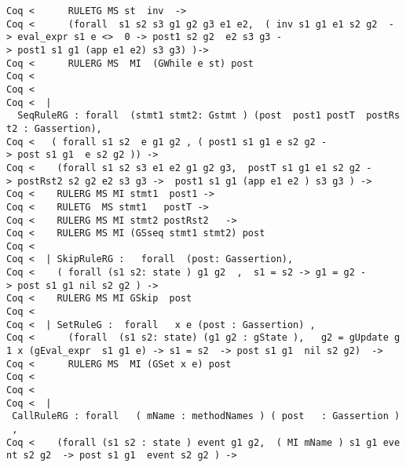 \documentclass{article}
\begin{document}
{\begin{flushleft}
\texttt{Coq~{<}~~~~~~RULETG~MS~st~~inv~~-{>}}\\
\texttt{Coq~{<}~~~~~~(forall~~s1~s2~s3~g1~g2~g3~e1~e2,~~(~inv~s1~g1~e1~s2~g2~~-{>}~eval\_expr~s1~e~{<}{>}~~0~-{>}~post1~s2~g2~~e2~s3~g3~-{>}~post1~s1~g1~(app~e1~e2)~s3~g3)~)-{>}}\\
\texttt{Coq~{<}~~~~~~RULERG~MS~~MI~~(GWhile~e~st)~post~~}\\
\texttt{Coq~{<}~}\\
\texttt{Coq~{<}~}\\
\texttt{Coq~{<}~~|~~SeqRuleRG~:~forall~~(stmt1~stmt2:~Gstmt~)~(post~~post1~postT~~postRst2~:~Gassertion),~}\\
\texttt{Coq~{<}~~~(~forall~s1~s2~~e~g1~g2~,~(~post1~s1~g1~e~s2~g2~-{>}~post~s1~g1~~e~s2~g2~))~-{>}~}\\
\texttt{Coq~{<}~~~~(forall~s1~s2~s3~e1~e2~g1~g2~g3,~~postT~s1~g1~e1~s2~g2~-{>}~postRst2~s2~g2~e2~s3~g3~-{>}~~post1~s1~g1~(app~e1~e2~)~s3~g3~)~-{>}~}\\
\texttt{Coq~{<}~~~~RULERG~MS~MI~stmt1~~post1~-{>}}\\
\texttt{Coq~{<}~~~~RULETG~~MS~stmt1~~~postT~-{>}~}\\
\texttt{Coq~{<}~~~~RULERG~MS~MI~stmt2~postRst2~~~-{>}}\\
\texttt{Coq~{<}~~~~RULERG~MS~MI~(GSseq~stmt1~stmt2)~post}\\
\texttt{Coq~{<}~}\\
\texttt{Coq~{<}~~|~SkipRuleRG~:~~~forall~~(post:~Gassertion),}\\
\texttt{Coq~{<}~~~~(~forall~(s1~s2:~state~)~g1~g2~~,~~s1~=~s2~-{>}~g1~=~g2~-{>}~post~s1~g1~nil~s2~g2~)~-{>}}\\
\texttt{Coq~{<}~~~~RULERG~MS~MI~GSkip~~post}\\
\texttt{Coq~{<}~}\\
\texttt{Coq~{<}~~|~SetRuleG~:~~forall~~~x~e~(post~:~Gassertion)~,~}\\
\texttt{Coq~{<}~~~~~~(forall~~(s1~s2:~state)~(g1~g2~:~gState~),~~~g2~=~gUpdate~g1~x~(gEval\_expr~~s1~g1~e)~-{>}~s1~=~s2~~-{>}~post~s1~g1~~nil~s2~g2)~~-{>}}\\
\texttt{Coq~{<}~~~~~~RULERG~MS~~MI~(GSet~x~e)~post}\\
\texttt{Coq~{<}~}\\
\texttt{Coq~{<}~}\\
\texttt{Coq~{<}~~|~CallRuleRG~:~forall~~~(~mName~:~methodNames~)~(~post~~~:~Gassertion~)~,~}\\
\texttt{Coq~{<}~~~~(forall~(s1~s2~:~state~)~event~g1~g2,~~(~MI~mName~)~s1~g1~event~s2~g2~~-{>}~post~s1~g1~~event~s2~g2~)~-{>}}\\

\end{flushleft}}
\end{document}
